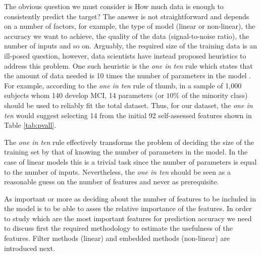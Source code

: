 \documentclass[preprint,12pt]{elsarticle}
\begin{document}
The obvious question we must consider is How much data is enough to consistently predict the target? The answer is not straightforward and depends on a number of factors, for example, the type of model (linear or non-linear), the accuracy we want to achieve, the quality of the data (signal-to-noise ratio), the number of inputs and so on. Arguably, the required size of the training data is an ill-posed question, however, data scientists have instead proposed heuristics to address this problem. One such heuristic is the \emph{one in ten} rule which states that the amount of data needed is 10 times the number of parameters in the model \cite{harrell2001reg}. For example, according to the \emph{one in ten} rule of thumb, in a sample of 1,000 subjects whom 140 develop MCI, 14 parameters (or $10\%$ of the minority class) should be used to reliably fit the total dataset. Thus, for our dataset, the \emph{one in ten} would suggest selecting 14 from the initial 92 self-assessed features shown in Table \ref{tab:pvall}. 

The \emph{one in ten} rule effectively transforms the problem of deciding the size of the training set by that of knowing the number of parameters in the model. In the case of linear models this is a trivial task since the number of parameters is equal to the number of inputs. 
Nevertheless, the \emph{one in ten} should be seen as a reasonable guess on the number of features and never as prerequisite.

As important or more as deciding about the number of features to be included in the model is to be able to asses the relative importance of the features. In order to study which are the most important features for prediction accuracy we need to discuss first the required methodology to estimate the usefulness of the features. Filter methods (linear) and embedded methods (non-linear) are introduced next.


\end{document}
